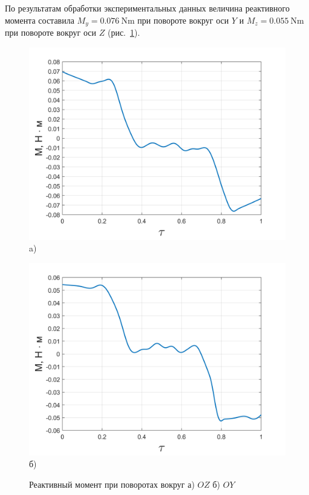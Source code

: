 По результатам обработки экспериментальных данных величина реактивного момента составила $M_y = \SI{0,076}{\newton\meter}$ при повороте вокруг оси $Y$ и $M_z = \SI{0,055}{\newton\meter}$ при повороте вокруг оси $Z$ (рис.~\cref{fig:omn-mom}).

\begin{figure}[!h]
	\begin{minipage}[b]{0.49\linewidth}\centering
		\includegraphics[width=0.85\linewidth]{matlab/img/oy-gyro-mom.png}\\[-2pt] a)
	\end{minipage}
	\hfill
	\begin{minipage}[b]{0.49\linewidth}\centering
		\includegraphics[width=0.85\linewidth]{matlab/img/oz-gyro-mom.png}\\[-2pt] б)
	\end{minipage}
	\caption{Реактивный момент при поворотах вокруг а) $OZ$ б) $OY$}
	\label{fig:omn-mom}
\end{figure}


